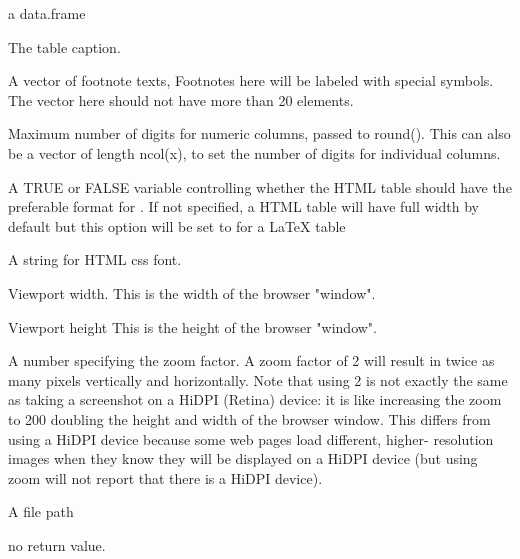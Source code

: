 \documentclass[letterpaper]{book}
\begin{document}
%
\begin{Arguments}
\begin{ldescription}
\item[\code{data}] a data.frame

\item[\code{caption}] The table caption.

\item[\code{footnote}] A vector of footnote texts, Footnotes here will be labeled with special symbols.
The vector here should not have more than 20 elements.

\item[\code{digits}] Maximum number of digits for numeric columns, passed to round(). This can also be a vector of length ncol(x), to set the
number of digits for individual columns.

\item[\code{full\_width}] A TRUE or FALSE variable controlling whether the HTML table should have the preferable format for
. If not specified, a HTML table will have full width by default but this option will be set to  for a LaTeX table

\item[\code{html\_font}] A string for HTML css font.

\item[\code{vwidth}] Viewport width. This is the width of the browser "window".

\item[\code{vheight}] Viewport height This is the height of the browser "window".

\item[\code{zoom}] A number specifying the zoom factor. A zoom factor of 2 will result in twice as many pixels vertically and horizontally. Note that
using 2 is not exactly the same as taking a screenshot on a HiDPI (Retina) device: it is like increasing the zoom to 200 doubling the
height and width of the browser window. This differs from using a HiDPI device because some web pages load different, higher-
resolution images when they know they will be displayed on a HiDPI device (but using zoom will not report that there is a HiDPI
device).

\item[\code{file}] A file path
\end{ldescription}
\end{Arguments}
%
\begin{Value}
no return value.
\end{Value}
\end{document}

